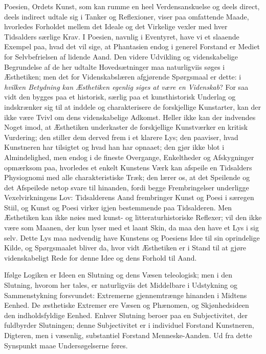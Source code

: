 \documentclass[12pt]{book}
\newcommand{\apage}[1]{\marginnote{\footnotesize\textit{[#1]}}}
\begin{document}
Poesien, Ordets Kunst, som kan rumme en heel Verdensanskuelse og deels direct,
deels indirect udtale sig i Tanker og Reflexioner, viser paa omfattende Maade,
hvorledes Forholdet mellem det Ideale og det Virkelige vexler med hver
Tidsalders særlige Krav. I Poesien, navnlig i Eventyret, have vi et slaaende
Exempel paa, hvad det vil sige, at Phantasien endog i generel Forstand er
Mediet for Selvbefrielsen af lidende Aand. Den videre Udvikling og
videnskabelige Begrundelse af de her udtalte Hovedsætninger maa naturligviis
søges i Æsthetiken; men det for Videnskabslæren afgjørende Spørgsmaal er
dette: i \emph{hvilken Betydning kan Æsthetiken egenlig siges at være en Videnskab}?
For saa vidt den bygges paa et historisk, særlig paa et kunsthistorisk
Underlag og indskrænker sig til at inddele og charakterisere de forskjellige
Kunstarter, kan der ikke være Tvivl om dens videnskabelige Adkomst. Heller
ikke kan der indvendes Noget imod, at Æsthetiken underkaster de forskjellige
Kunstværker en kritisk Vurdering; den stiller dem derved frem i et klarere
Lys; den paaviser, hvad Kunstneren har tilsigtet og hvad han har opnaaet; den
gjør ikke blot i Almindelighed, men \apage{252} endog i de fineste Overgange, Enkeltheder
og Afskygninger opmærksom paa, hvorledes et enkelt Kunstens Værk kan afspeile
en Tidsalders Physiognomi med alle charakteristiske Træk; den lærer os, at det
Speilende og det Afspeilede netop svare til hinanden, fordi begge
Frembringelser underligge Vexelvirkningens Lov: Tidsalderens Aand frembringer
Kunst og Poesi i særegen Stiil, og Kunst og Poesi virker igjen bestemmende paa
Tidsalderen. Men Æsthetiken kan ikke nøies med kunst- og litteraturhistoriske
Reflexer; vil den ikke være som Maanen, der kun lyser med et laant Skin, da
maa den have et Lys i sig selv. Dette Lys maa nødvendig have Kunstens og
Poesiens Idee til sin oprindelige Kilde, og Spørgsmaalet bliver da, hvor vidt
Æsthetiken er i Stand til at gjøre videnskabeligt Rede for denne Idee og dens
Forhold til Aand.

Ifølge Logiken er Ideen en Slutning og dens Væsen teleologisk; men i den
Slutning, hvorom her tales, er naturligviis det Middelbare i Udstykning og
Sammenstykning forsvundet: Extremerne gjennemtrænge hinanden i Midtens Eenhed.
De æsthetiske Extremer ere Væsen og Phænomen, og Skjønhedsideen den
indholdsfyldige Eenhed. Enhver Slutning beroer paa en Subjectivitet, der
fuldbyrder Slutningen; denne Subjectivitet er i individuel Forstand
Kunstneren, Digteren, men i væsenlig, substantiel Forstand Menneske-Aanden.
Ud fra dette Synspunkt maae Undersøgelserne føres.
\end{document}
